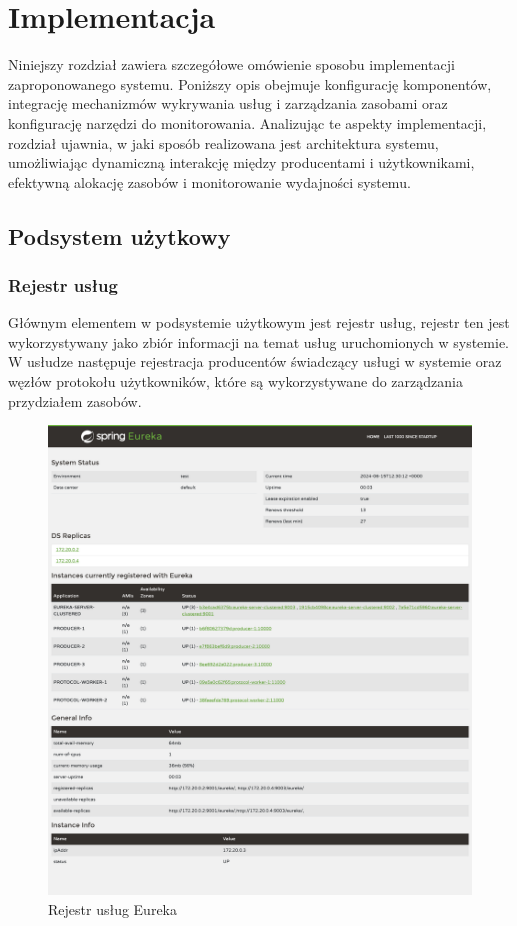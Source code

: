\chapter{Implementacja}

Niniejszy rozdział zawiera szczegółowe omówienie sposobu implementacji zaproponowanego systemu. Poniższy opis obejmuje konfigurację komponentów, integrację mechanizmów wykrywania usług i zarządzania zasobami oraz konfigurację narzędzi do monitorowania. Analizując te aspekty implementacji, rozdział ujawnia, w jaki sposób realizowana jest architektura systemu, umożliwiając dynamiczną interakcję między producentami i użytkownikami, efektywną alokację zasobów i monitorowanie wydajności systemu.

\section{Podsystem użytkowy}
\subsection{Rejestr usług}

Głównym elementem w podsystemie użytkowym jest rejestr usług, rejestr ten jest wykorzystywany jako zbiór informacji na temat usług uruchomionych w systemie. W usłudze następuje rejestracja producentów świadczący usługi w systemie oraz węzłów protokołu użytkowników, które są wykorzystywane do zarządzania przydziałem zasobów.

\begin{figure}[!htbp]
    \centering
    \includegraphics[width=\textwidth]{images/implementation/ServerDiscovery3Producer2Workers.png}
    \caption{Rejestr usług Eureka}
    \label{eurekaServerItems}
\end{figure}

